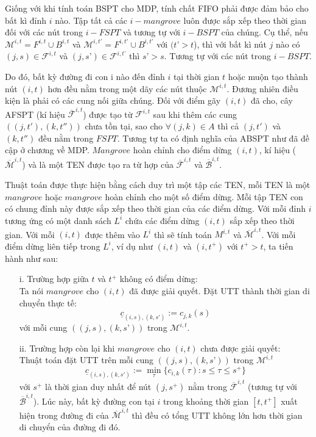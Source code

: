\documentclass[../main.tex]{subfiles}
\begin{document}
Giống với khi tính toán BSPT cho MDP, tính chất FIFO phải được đảm bảo
cho bất kì đỉnh \(i\) nào. Tập tất cả các \(i-mangrove\) luôn được sắp
xếp theo thời gian đối với các nút trong \(i-FSPT\) và tương tự với
\(i-BSPT\) của chúng. Cụ thể, nếu \(\mathcal M^{i, t}=F^{i,t}\cup B^{i,t}\)
và \(\mathcal M^{i, t'}=F^{i,t'}\cup B^{i,t'}\) với \((t’ > t\)), thì với
bất kì nút \(j\) nào có \((j,s) \in \mathcal F^{i, t}\) và
\((j,s’) \in \mathcal F^{i, t’}\) thì \(s’ > s\). Tương tự với các nút trong
\(i-BSPT\).

Do đó, bất kỳ đường đi con i nào đến đỉnh \(i\) tại thời gian \(t\) hoặc
muộn tạo thành nút \((i,t)\) hơn đều nằm trong một dãy các nút thuộc
\(\mathcal M^{i, t}\). Đương nhiên điều kiện là phải có các cung nối giữa
chúng. Đối với điểm gãy \((i, t)\) đã cho, cây AFSPT (kí hiệu
\(\mathcal{\overline{F}}^{i,t}\)) được tạo từ \(\mathcal F^{i,t}\) sau khi thêm
các cung \(((j, t'), (k, t''))\) chưa tồn tại, sao cho
\(\forall (j, k) \in A\) thì cả \((j,t')\) và \((k,t'')\) đều nằm trong
\(FSPT.\) Tương tự ta có định nghĩa của ABSPT như đã đề cập ở chương về
MDP. \(Mangrove\) hoàn chỉnh cho điểm dừng \((i, t)\), kí hiệu
(\(\overline{\mathcal M}^{i,t}\)) và là một TEN được tạo ra từ hợp của
\(\mathcal{\overline{F}}^{i,t}\) và \(\mathcal{\overline{B}}^{i,t}\).

Thuật toán được thực hiện bằng cách duy trì một tập các TEN, mỗi TEN là
một \(mangrove\) hoặc \(mangrove\) hoàn chỉnh cho một số điểm dừng. Mỗi
tập TEN con có chung đỉnh này được sắp xếp theo thời gian của các điểm
dừng. Với mỗi đỉnh \(i\) tương ứng có một danh sách \(L^i\) chứa các
điểm dừng \((i, t)\) sắp xếp theo thời gian. Với mỗi \((i, t)\) được
thêm vào \(L^i\) thì sẽ tính toán \(M^{i, t}\) và
\(\overline{\mathcal M}^{i,t}\). Với mỗi điểm dừng liên tiếp trong \(L^i\),
ví dụ như \((i,t)\) và \((i,t^+)\) với \(t^+ > t\), ta tiến hành như
sau:

\begin{itemize}
\tightlist
\item[i.]
  Trường hợp giữa \(t\) và \(t^+\) không có điểm dừng: \\
  Ta nói
  \(mangrove\) cho \((i, t)\) đã được giải quyết. Đặt UTT thành thời
  gian di chuyển thực tế:
  \[\underline c_{(i, s), (k, s')}:=c_{j, k}(s)\] với mỗi cung
  \(((j,s),(k,s’))\) trong \(\mathcal M^{i,t}\).
\item[ii.]
  Trường hợp còn lại khi \(mangrove\) cho \((i, t)\) chưa được giải
  quyết: \\
  Thuật toán đặt UTT trên mỗi cung \(((j, s), (k, s’))\) trong
  \(\mathcal M^{i,t}\)
  \[\underline c_{(i, s), (k, s')}:=\min_\tau\{c_{i, k}(\tau):s\le \tau \le s^+\}\]
  với \(s^+\) là thời gian duy nhất để nút \((j, s^+)\) nằm trong
  \(\mathcal{\overline{F}}^{i,t}\) (tương tự với \(\mathcal{\overline{B}}^{i,t}\)).
  Lúc này, bất kỳ đường con tại \(i\) trong khoảng thời gian \([t,t^+]\)
  xuất hiện trong đường đi của \(\overline{\mathcal M}^{i,t}\) thì đều có
  tổng UTT không lớn hơn thời gian di chuyển của đường đi đó.
\end{itemize}
\end{document}
